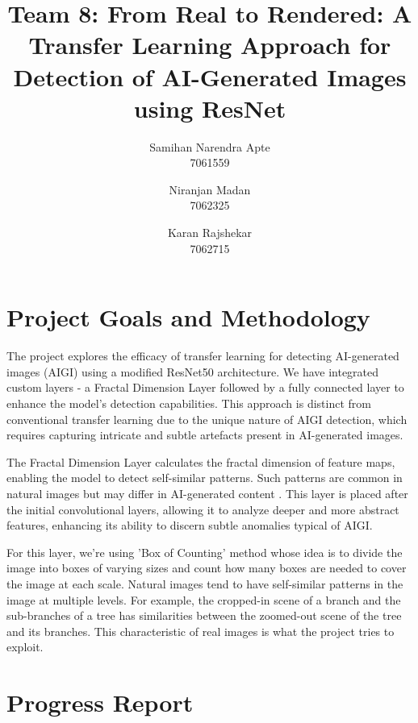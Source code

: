 \documentclass[10pt,twocolumn,letterpaper]{article}
\begin{document}
\title{Team 8: From Real to Rendered: A Transfer Learning Approach for Detection of AI-Generated Images using ResNet  }

\author{
Samihan Narendra Apte\\
7061559\\
\and
Niranjan Madan\\
7062325\\
\and
Karan Rajshekar\\
7062715\\
}
\maketitle

\section{Project Goals and Methodology}

The project explores the efficacy of transfer learning for detecting AI-generated images (AIGI) using a modified ResNet50 architecture. We have integrated custom layers - a Fractal Dimension Layer followed by a fully connected layer to enhance the model's detection capabilities. This approach is distinct from conventional transfer learning due to the unique nature of AIGI detection, which requires capturing intricate and subtle artefacts present in AI-generated images.

The Fractal Dimension Layer calculates the fractal dimension of feature maps, enabling the model to detect self-similar patterns. Such patterns are common in natural images but may differ in AI-generated content \cite{fractal1,fractal2}.  This layer is placed after the initial convolutional layers, allowing it to analyze deeper and more abstract features, enhancing its ability to discern subtle anomalies typical of AIGI.

For this layer, we're using 'Box of Counting' method whose idea is to divide the image into boxes of varying sizes and count how many boxes are needed to cover the image at each scale. Natural images tend to have self-similar patterns in the image at multiple levels. For example, the cropped-in scene of a branch and the sub-branches of a tree has similarities between the zoomed-out scene of the tree and its branches. This characteristic of real images is what the project tries to exploit. 

\section{Progress Report}
\end{document}
